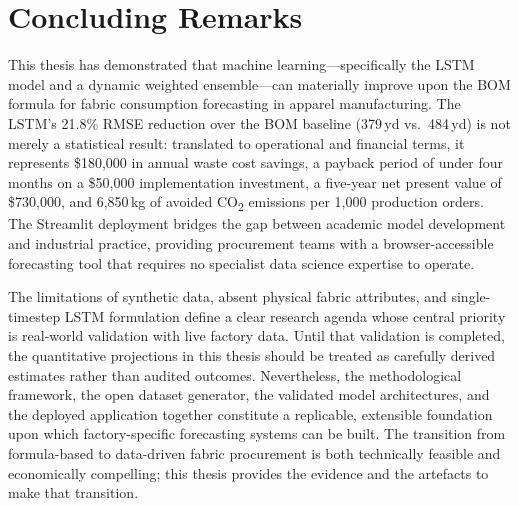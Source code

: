 \section{Concluding Remarks}
This thesis has demonstrated that machine learning---specifically the LSTM model and a dynamic weighted ensemble---can materially improve upon the BOM formula for fabric consumption forecasting in apparel manufacturing. The LSTM's 21.8\% RMSE reduction over the BOM baseline (379\,yd vs.\ 484\,yd) is not merely a statistical result: translated to operational and financial terms, it represents \$180{,}000 in annual waste cost savings, a payback period of under four months on a \$50{,}000 implementation investment, a five-year net present value of \$730{,}000, and 6{,}850\,kg of avoided CO\textsubscript{2} emissions per 1{,}000 production orders. The Streamlit deployment bridges the gap between academic model development and industrial practice, providing procurement teams with a browser-accessible forecasting tool that requires no specialist data science expertise to operate.

The limitations of synthetic data, absent physical fabric attributes, and single-timestep LSTM formulation define a clear research agenda whose central priority is real-world validation with live factory data. Until that validation is completed, the quantitative projections in this thesis should be treated as carefully derived estimates rather than audited outcomes. Nevertheless, the methodological framework, the open dataset generator, the validated model architectures, and the deployed application together constitute a replicable, extensible foundation upon which factory-specific forecasting systems can be built. The transition from formula-based to data-driven fabric procurement is both technically feasible and economically compelling; this thesis provides the evidence and the artefacts to make that transition.
